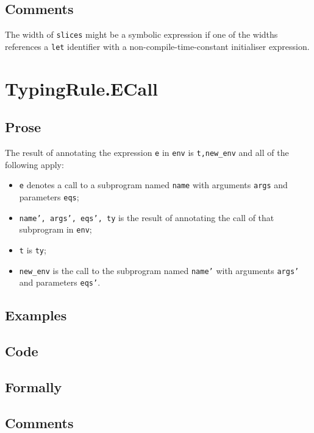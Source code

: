 \documentclass{book}
\begin{document}
  \subsection{Comments}
    The width of \texttt{slices} might be a symbolic expression if one of the
widths references a \texttt{let} identifier with a non-compile-time-constant initialiser
expression.

\section{TypingRule.ECall \label{sec:TypingRule.ECall}}

  \subsection{Prose}
  The result of annotating the expression \texttt{e} in \texttt{env} is
\texttt{t,new\_env} and all of the following apply:
  \begin{itemize}
  \item \texttt{e} denotes a call to a subprogram named \texttt{name} with arguments \texttt{args} and
    parameters \texttt{eqs};
  \item \texttt{name', args', eqs', ty} is the result of annotating the call of
    that subprogram in \texttt{env};
  \item \texttt{t} is \texttt{ty};
  \item \texttt{new\_env} is the call to the subprogram named \texttt{name'} with arguments \texttt{args'}
    and parameters \texttt{eqs'}.
  \end{itemize}

  \subsection{Examples}

  \subsection{Code}

  \subsection{Formally}

  \subsection{Comments}
\end{document}
